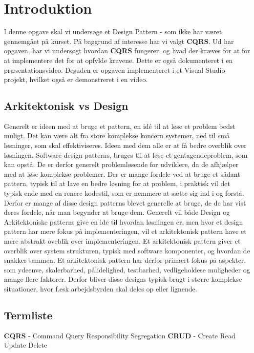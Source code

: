 \chapter{Introduktion}
I denne opgave skal vi undersøge et Design Pattern - som ikke har været gennemgået på kurset. 
På baggrund af interesse har vi valgt \textbf{CQRS}. Ud har opgaven, har vi undersøgt hvordan \textbf{CQRS} fungerer, og hvad der kræves for at for at implementere det for at opfylde kravene. Dette er også dokumenteret i en præsentationsvideo.
Desuden er opgaven implementeret i et Visual Studio projekt, hvilket også er demonstreret i en video.

\section{Arkitektonisk vs Design}
Generelt er ideen med at bruge et pattern, en idé til at løse et problem bedst muligt. Det kan være alt fra store komplekse koncern systemer, ned til små løsninger, som skal effektiviseres. Ideen med dem alle er at få bedre overblik over løsningen.
\newline
Software design patterns, bruges til at løse et gentagendeproblem, som kan opstå. De er derfor generelt problemløsende for udviklere, da de afhjælper med at løse komplekse problemer.
Der er mange fordele ved at bruge et sådant pattern, typisk til at lave en bedre løsning for at problem, i praktisk vil det typisk ende med en renere kodestil, som er nemmere at sætte sig ind i og forstå. Derfor er mange af disse design patterns blevet generelle at bruge, de de har vist deres fordele, når man begynder at bruge dem.
\newline
Generelt vil både Design og Arkitektoniske patterns give en ide til hvordan løsningen er, men hvor et design pattern har mere fokus på implementeringen, vil et arkitektonisk pattern have et mere abstrakt oveblik over implementeringen.
Et arkitektonisk pattern giver et overblik over system strukturen, typisk med software komponenter, og hvordan de snakker sammen. Et arkitektonisk pattern har derfor primært fokus på aspekter, som ydeenve, skalerbarhed, pålidelighed, testbarhed, vedligeholdese muligheder og mange flere faktorer. Derfor bliver disse designs typisk brugt i større komplekse situationer, hvor f.esk arbejdsbyrden skal deles op eller lignende.

\section{Termliste}
\textbf{CQRS} - Command Query Responsibility Segregation
\newline
\textbf{CRUD} - Create Read Update Delete

